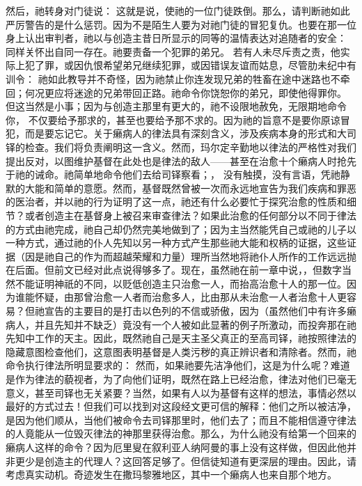 然后，祂转身对门徒说：  这就是说，使祂的一位门徒跌倒。那么，请判断祂如此严厉警告的是什么惩罚。因为不是陌生人要为对祂门徒的冒犯复仇。也要在那一位身上认出审判者，祂以与创造主昔日所显示的同等的温情表达对追随者的安全：  同样关怀出自同一存在。祂要责备一个犯罪的弟兄。 若有人未尽斥责之责，他实际上犯了罪，或因仇恨希望弟兄继续犯罪，或因错误友谊而姑息，尽管肋未纪中有训令： 祂如此教导并不奇怪，因为祂禁止你连发现兄弟的牲畜在途中迷路也不牵回；何况更应将迷途的兄弟带回正路。祂命令你饶恕你的弟兄，即使他得罪你。 但这当然是小事；因为与创造主那里有更大的，祂不设限地赦免，无限期地命令你， 不仅要给予那求的，甚至也要给予那不求的。因为祂的旨意不是要你原谅冒犯，而是要忘记它。\newline{}关于癞病人的律法具有深刻含义，涉及疾病本身的形式和大司铎的检查。我们将负责阐明这一含义。然而，玛尔定辛勤地以律法的严格性对我们提出反对，以图维护基督在此处也是律法的敌人——甚至在治愈十个癞病人时抢先于祂的诫命。祂简单地命令他们去给司铎察看；， 没有触摸，没有言语，凭祂静默的大能和简单的意愿。然而，基督既然曾被一次而永远地宣告为我们疾病和罪恶的医治者，并以祂的行为证明了这一点，祂还有什么必要忙于探究治愈的性质和细节？或者创造主在基督身上被召来审查律法？如果此治愈的任何部分以不同于律法的方式由祂完成，祂自己却仍然完美地做到了；因为主当然能凭自己或祂的儿子以一种方式，通过祂的仆人先知以另一种方式产生那些祂大能和权柄的证据，这些证据（因是祂自己的作为而超越荣耀和力量）理所当然地将祂仆人所作的工作远远抛在后面。但前文已经对此点说得够多了。\newline{}现在，虽然祂在前一章中说，，但数字当然不能证明神祇的不同，以贬低创造主只治愈一人，而抬高治愈十人的那一位。因为谁能怀疑，由那曾治愈一人者而治愈多人，比由那从未治愈一人者治愈十人更容易？但祂宣告的主要目的是打击以色列的不信或骄傲，因为（虽然他们中有许多癞病人，并且先知并不缺乏）竟没有一个人被如此显著的例子所激动，而投奔那在祂先知中工作的天主。因此，既然祂自己是天主圣父真正的至高司铎，祂按照律法的隐藏意图检查他们，这意图表明基督是人类污秽的真正辨识者和清除者。然而，祂命令执行律法所明显要求的：  然而，如果祂要先洁净他们，这是为什么呢？难道是作为律法的藐视者，为了向他们证明，既然在路上已经治愈，律法对他们已毫无意义，甚至司铎也无关紧要？当然，如果有人以为基督有这样的想法，事情必然以最好的方式过去！但我们可以找到对这段经文更可信的解释：他们之所以被洁净，是因为他们顺从，当他们被命令去司铎那里时，他们去了；而且不能相信遵守律法的人竟能从一位毁灭律法的神那里获得治愈。那么，为什么祂没有给第一个回来的癞病人这样的命令？因为厄里叟在叙利亚人纳阿曼的事上没有这样做，但因此他并非更少是创造主的代理人？这回答足够了。但信徒知道有更深层的理由。因此，请考虑真实动机。奇迹发生在撒玛黎雅地区，其中一个癞病人也来自那个地方。 